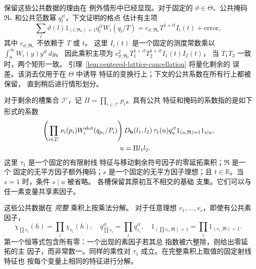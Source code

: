 保留这些公共数据的理由在
例外情形中已经显现。对于固定的 \(\vartheta\in\Theta\)、公共掩码
\(\mathfrak R_*\) 和公共范数幂 \(q_l^{it}\)，下文证明的格点
估计有主项
\[
 \sum_l\vartheta(l)1_{(l,\mathfrak R_*)=1}q_l^{it}W_i(q_l/T)
 =c_{\vartheta,\mathfrak R_*}T^{1+it}I_i(t)+\text{error},
\]
其中 \(c_{\vartheta,\mathfrak R_*}\) 不依赖于 \(T\) 或 \(t\)。
这里 \(I_i(t)\) 是一个固定的测度常数乘以
\(\int_0^\infty W_i(y)y^{it}\,dy\)。
因此乘积主项为
\(c_{\vartheta,\mathfrak R_*}^2T_1^{1+it}T_2^{1+it}I_1(t)I_2(t)\)，
当 \(T_1T_2\) 一致时，两个矩形一致。
引理~\ref{lem:centered-lattice-cancellation} 将量化剩余的
误差。该消去仅用于在 \(\Theta\) 中诱导
特征的变换行上；下文的公共系数在所有行上都被保留，
直到稍后进行情形划分。

对于剩余的槽集合 \(\mathcal I'\)，记
\(\Pi=\prod_{i\in\mathcal I'}p_i\)。具有公共
特征和掩码的系数指的是如下形式的系数
\begin{equation}
 \begin{split}
 &\left(\prod_{i\in\mathcal I'}
       \nu_i(p_i)W_i^{\rm slot}(q_{p_i}/P_i)\right)
 D_{\mathbf b}(l_1,l_2)\,
 \tau_1(u)q_u^{it}
 1_{(u,\mathfrak R)=1}1_{s\mid u},\\
 &\hspace{40mm}u=\Pi l_1l_2.
 \end{split}
 \label{eq:centered-coefficient-form}
\end{equation}
这里 \(\tau_1\) 是一个固定的有限射线
特征与移动剩余符号因子的零延拓乘积；\(\mathfrak R\) 是一个
固定的无平方因子额外掩码；\(s\) 是一个固定的无平方因子理想；且
\(t\in\mathbb R\)。当 \(s=1\) 时，条件 \(s\mid u\) 被省略。
各槽保留其原初互不相交的基础
支集。它们可以与任一素变量共享素因子。

这些公共数据在 \emph{完整} 乘积上按乘法分解。
对于任意理想 \(v_1,\ldots,v_r\)，即使有公共素因子，
\[
 \chi_{\prod v_i}(h)=\prod_i\chi_{v_i}(h),\quad
 q_{\prod v_i}^{it}=\prod_iq_{v_i}^{it},\quad
 1_{(\prod v_i,\mathfrak R)=1}
   =\prod_i1_{(v_i,\mathfrak R)=1}.
\]
第一个恒等式包含所有零：一个出现的素因子若其总
指数被六整除，则给出零延拓的主
因子，而非常数一。同样的乘性对
\(\tau_1\) 成立。在完整乘积上取值的固定射线特征也
按每个变量上相同的特征进行分解。

